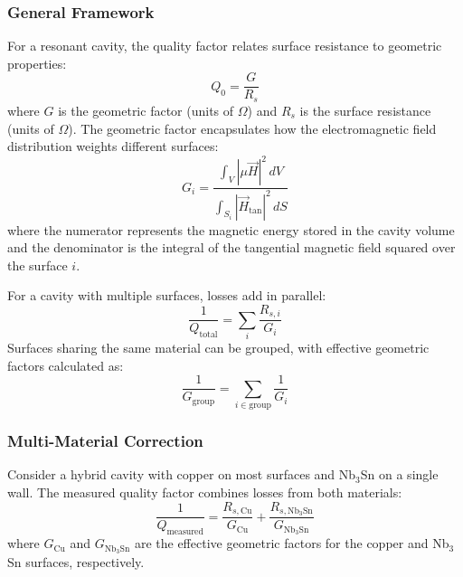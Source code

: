     
    \subsubsection{General Framework}
    
    For a resonant cavity, the quality factor relates surface resistance to geometric properties:
    \begin{equation}
        Q_0 = \frac{G}{R_s}
        \label{eq:Q_basic}
    \end{equation}
    where $G$ is the geometric factor (units of $\Omega$) and $R_s$ is the surface resistance (units of $\Omega$). The geometric factor encapsulates how the electromagnetic field distribution weights different surfaces:
    \begin{equation}
        G_i = \frac{\int_V |\mu \vec{H}|^2 \, dV}{\int_{S_i} |\vec{H}_\text{tan}|^2 \, dS}
        \label{eq:G_definition}
    \end{equation}
    where the numerator represents the magnetic energy stored in the cavity volume and the denominator is the integral of the tangential magnetic field squared over the surface $i$.
    
    For a cavity with multiple surfaces, losses add in parallel:
    \begin{equation}
        \frac{1}{Q_\text{total}} = \sum_{i} \frac{R_{s,i}}{G_i}
        \label{eq:Q_multisurf}
    \end{equation}
    Surfaces sharing the same material can be grouped, with effective geometric factors calculated as:
    \begin{equation}
        \frac{1}{G_\text{group}} = \sum_{i \in \text{group}} \frac{1}{G_i}
        \label{eq:G_grouped}
    \end{equation}
    
    \subsubsection{Multi-Material Correction}
    
    Consider a hybrid cavity with copper on most surfaces and Nb$_3$Sn on a single wall. The measured quality factor combines losses from both materials:
    \begin{equation}
        \frac{1}{Q_\text{measured}} = \frac{R_{s,\text{Cu}}}{G_\text{Cu}} + \frac{R_{s,\text{Nb}_3\text{Sn}}}{G_{\text{Nb}_3\text{Sn}}}
        \label{eq:Q_hybrid}
    \end{equation}
    where $G_\text{Cu}$ and $G_{\text{Nb}_3\text{Sn}}$ are the effective geometric factors for the copper and Nb$_3$Sn surfaces, respectively.
    
